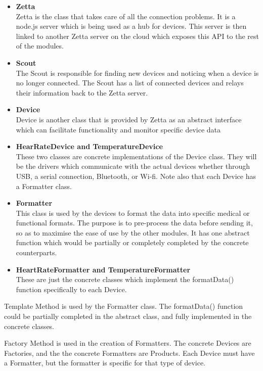 \begin{itemize}
	\item \textbf{Zetta}\\
	Zetta is the class that takes care of all the connection problems. It is a node.js server which is being used as a hub for devices. This server is then linked to another Zetta server on the cloud which exposes this API to the rest of the modules.

	\item \textbf{Scout}\\
	The Scout is responsible for finding new devices and noticing when a device is no longer connected. The Scout has a list of connected devices and relays their information back to the Zetta server.

	\item \textbf{Device}\\
	Device is another class that is provided by Zetta as an abstract interface which can facilitate functionality and monitor specific device data

	\item \textbf{HearRateDevice and TemperatureDevice}\\
	These two classes are concrete implementations of the Device class. They will be the drivers which communicate with the actual devices whether through USB, a serial connection, Bluetooth, or Wi-fi. Note also that each Device has a Formatter class.

	\item \textbf{Formatter}\\
	This class is used by the devices to format the data into specific medical or functional formats. The purpose is to pre-process the data before sending it, so as to maximise the ease of use by the other modules. It has one abstract function which would be partially or completely completed by the concrete counterparts.

	\item \textbf{HeartRateFormatter and TemperatureFormatter}\\
	These are just the concrete classes which implement the formatData() function specifically to each Device.
\end{itemize}
Template Method is used by the Formatter class. The formatData() function could be partially completed in the abstract class, and fully implemented in the concrete classes.

Factory Method is used in the creation of Formatters. The concrete Devices are Factories, and the the concrete Formatters are Products. Each Device must have a Formatter, but the formatter is specific for that type of device.